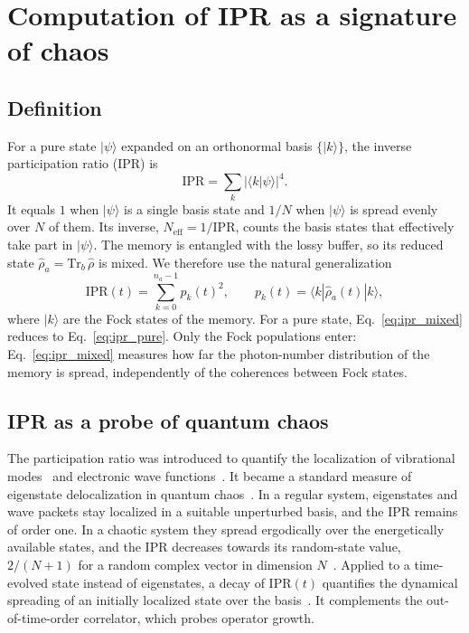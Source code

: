 \documentclass[aps,prx,reprint,floatfix,amsmath,amssymb,longbibliography]{revtex4-2}
\begin{document}
\section{Computation of IPR as a signature of chaos}
\label{app:ipr}

\subsection{Definition}

For a pure state $|\psi\rangle$ expanded on an orthonormal basis
$\{|k\rangle\}$, the inverse participation ratio (IPR) is
\begin{equation}
  \mathrm{IPR} = \sum_k |\langle k|\psi\rangle|^4 .
  \label{eq:ipr_pure}
\end{equation}
It equals $1$ when $|\psi\rangle$ is a single basis state and $1/N$ when
$|\psi\rangle$ is spread evenly over $N$ of them. Its inverse,
$N_\mathrm{eff} = 1/\mathrm{IPR}$, counts the basis states that effectively
take part in $|\psi\rangle$. The memory is entangled with the lossy buffer, so
its reduced state $\hat\rho_a = \mathrm{Tr}_b\,\hat\rho$ is mixed. We
therefore use the natural generalization
\begin{equation}
  \mathrm{IPR}(t) = \sum_{k=0}^{n_a-1} p_k(t)^2 ,
  \qquad
  p_k(t) = \langle k|\hat\rho_a(t)|k\rangle ,
  \label{eq:ipr_mixed}
\end{equation}
where $|k\rangle$ are the Fock states of the memory. For a pure state,
Eq.~\eqref{eq:ipr_mixed} reduces to Eq.~\eqref{eq:ipr_pure}. Only the Fock
populations enter: Eq.~\eqref{eq:ipr_mixed} measures how far the photon-number
distribution of the memory is spread, independently of the coherences
between Fock states.

\subsection{IPR as a probe of quantum chaos}

The participation ratio was introduced to quantify the localization of
vibrational modes~\cite{Bell1970} and electronic wave
functions~\cite{Wegner1980,Kramer1993}. It became a standard measure of
eigenstate delocalization in quantum chaos~\cite{Izrailev1990,Haake2010}. In a
regular system, eigenstates and wave packets stay localized in a
suitable unperturbed basis, and the IPR remains of order one. In a chaotic
system they spread ergodically over the energetically available states, and
the IPR decreases towards its random-state value, $2/(N+1)$ for a random
complex vector in dimension $N$~\cite{Izrailev1990,Santos2010,Borgonovi2016}.
Applied to a time-evolved state instead of eigenstates, a decay of
$\mathrm{IPR}(t)$ quantifies the dynamical spreading of an initially localized
state over the basis~\cite{Borgonovi2016}. It complements the
out-of-time-order correlator, which probes operator growth.
\end{document}
